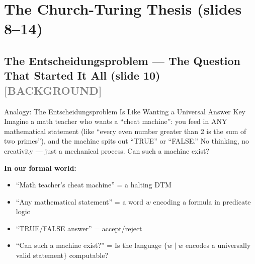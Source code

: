 \documentclass[11pt,a4paper]{article}
\newcommand{\kbg}{\textcolor{gray}{\textbf{[BACKGROUND]}}}
\begin{document}
\section{The Church-Turing Thesis (slides 8--14)}

\subsection{The Entscheidungsproblem --- The Question That Started It All (slide 10) \kbg}

\begin{notebox}{Analogy: The Entscheidungsproblem Is Like Wanting a Universal Answer Key}
Imagine a math teacher who wants a ``cheat machine'': you feed in ANY mathematical statement (like ``every even number greater than 2 is the sum of two primes''), and the machine spits out ``TRUE'' or ``FALSE.'' No thinking, no creativity --- just a mechanical process. Can such a machine exist?

\textbf{In our formal world:}
\begin{itemize}[nosep]
\item ``Math teacher's cheat machine'' = a halting DTM
\item ``Any mathematical statement'' = a word $w$ encoding a formula in predicate logic
\item ``TRUE/FALSE answer'' = accept/reject
\item ``Can such a machine exist?'' = Is the language $\{w \mid w$ encodes a universally valid statement$\}$ computable?
\end{itemize}
\end{notebox}
\end{document}
